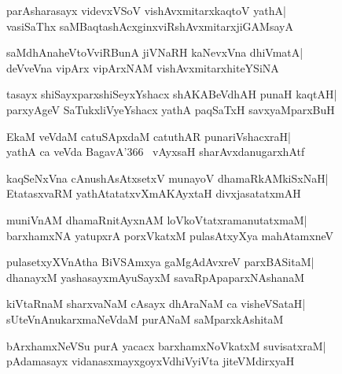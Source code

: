 \documentclass[twoside,12pt,openright]{book}
\newcounter{shloka}[chapter]
\begin{document}
\begin{shloka}%
parAsharasayx videvxVSoV vishAvxmitarxkaqtoV yathA|\\
vasiSaThx saMBaqtashAcxginxviRshAvxmitarxjiGAMsayA
\end{shloka}

\begin{shloka}%
saMdhAnaheVtoVviRBunA jiVNaRH kaNevxVna dhiVmatA|\\
deVveVna vipArx vipArxNAM vishAvxmitarxhiteYSiNA
\end{shloka}

\begin{shloka}%
tasayx shiSayxparxshiSeyxYshacx shAKABeVdhAH punaH kaqtAH|\\
parxyAgeV SaTukxliVyeYshacx yathA paqSaTxH savxyaMparxBuH
\end{shloka}

\begin{shloka}%
EkaM veVdaM catuSApxdaM catuthAR punariVshacxraH|\\
yathA ca veVda BagavA\char'366~ vAyxsaH sharAvxdanugarxhAtf
\end{shloka}

\begin{shloka}%
kaqSeNxVna cAnushAsAtxsetxV munayoV dhamaRkAMkiSxNaH|\\
EtatasxvaRM yathAtatatxvXmAKAyxtaH divxjasatatxmAH
\end{shloka}

\begin{shloka}%
muniVnAM dhamaRnitAyxnAM loVkoVtatxramanutatxmaM|\\
barxhamxNA yatupxrA porxVkatxM pulasAtxyXya mahAtamxneV
\end{shloka}

\begin{shloka}%
pulasetxyXVnAtha BiVSAmxya gaMgAdAvxreV parxBASitaM|\\
dhanayxM yashasayxmAyuSayxM savaRpApaparxNAshanaM
\end{shloka}

\begin{shloka}%
kiVtaRnaM sharxvaNaM cAsayx dhAraNaM ca visheVSataH|\\
sUteVnAnukarxmaNeVdaM purANaM saMparxkAshitaM
\end{shloka}

\begin{shloka}%
bArxhamxNeVSu purA yacacx barxhamxNoVkatxM suvisatxraM|\\
pAdamasayx vidanasxmayxgoyxVdhiVyiVta jiteVMdirxyaH
\end{shloka}
\end{document}
